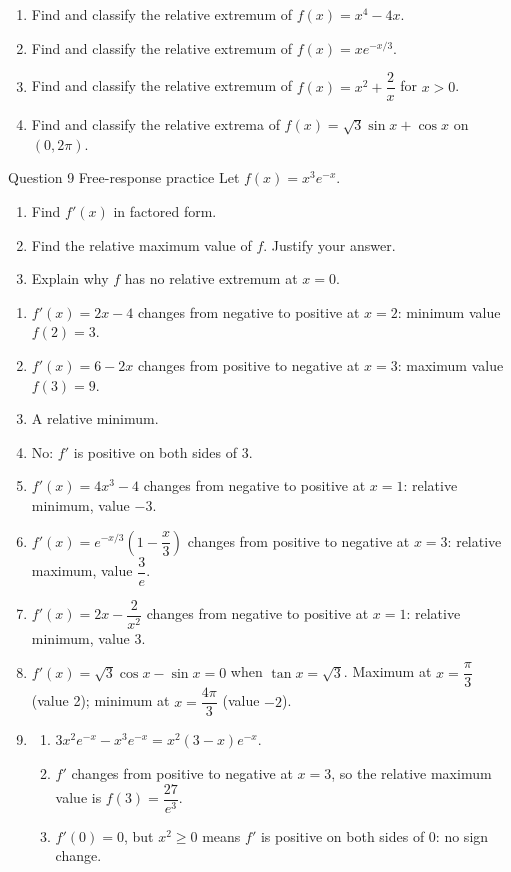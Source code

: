 \documentclass[11pt]{article}
\begin{document}
\begin{enumerate}[leftmargin=*,itemsep=2pt,start=5]
  \item Find and classify the relative extremum of $f(x)=x^4-4x$.\work{2.8cm}
  \item Find and classify the relative extremum of $f(x)=xe^{-x/3}$.\work{2.8cm}
  \item Find and classify the relative extremum of $f(x)=x^2+\dfrac2x$ for $x>0$.\work{2.8cm}
  \item Find and classify the relative extrema of $f(x)=\sqrt3\sin x+\cos x$ on $(0,2\pi)$.\work{2.8cm}
\end{enumerate}

\begin{frbox}{Question 9 \textperiodcentered{} Free-response practice}
Let $f(x)=x^3e^{-x}$.
\begin{enumerate}[label=(\alph*),leftmargin=*,itemsep=2pt]
  \item Find $f'(x)$ in factored form.\work{2.6cm}
  \item Find the relative maximum value of $f$. Justify your answer.\work{2.6cm}
  \item Explain why $f$ has no relative extremum at $x=0$.\work{2.6cm}
\end{enumerate}
\end{frbox}

\newpage
\begin{solbox}
\begin{enumerate}[leftmargin=*,itemsep=4pt]
  \item $f'(x)=2x-4$ changes from negative to positive at $x=2$: minimum value $f(2)=3$.
  \item $f'(x)=6-2x$ changes from positive to negative at $x=3$: maximum value $f(3)=9$.
  \item A relative minimum.
  \item No: $f'$ is positive on both sides of 3.
  \item $f'(x)=4x^3-4$ changes from negative to positive at $x=1$: relative minimum, value $-3$.
  \item $f'(x)=e^{-x/3}\left(1-\dfrac x3\right)$ changes from positive to negative at $x=3$: relative maximum, value $\dfrac3e$.
  \item $f'(x)=2x-\dfrac{2}{x^2}$ changes from negative to positive at $x=1$: relative minimum, value 3.
  \item $f'(x)=\sqrt3\cos x-\sin x=0$ when $\tan x=\sqrt3$. Maximum at $x=\dfrac\pi3$ (value 2); minimum at $x=\dfrac{4\pi}{3}$ (value $-2$).
  \item \begin{enumerate}[label=(\alph*),leftmargin=*,itemsep=3pt]
    \item $3x^2e^{-x}-x^3e^{-x}=x^2(3-x)e^{-x}$.
    \item $f'$ changes from positive to negative at $x=3$, so the relative maximum value is $f(3)=\dfrac{27}{e^3}$.
    \item $f'(0)=0$, but $x^2\ge0$ means $f'$ is positive on both sides of 0: no sign change.
  \end{enumerate}
\end{enumerate}
\end{solbox}
\end{document}
